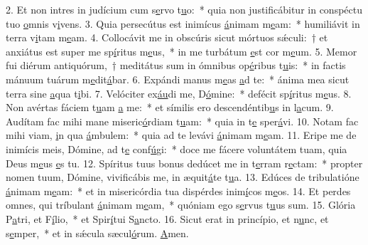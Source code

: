 2. Et non intres in judícium cum s\uline{e}rvo t\uline{u}o:~* quia non justificábitur in conspéctu tuo \uline{o}mnis v\uline{i}vens.
3. Quia persecútus est inimícus \uline{á}nimam m\uline{e}am:~* humiliávit in terra v\uline{i}tam m\uline{e}am.
4. Collocávit me in obscúris sicut mórtuos sǽculi:~† et anxiátus est super me sp\uline{í}ritus m\uline{e}us,~* in me turbátum \uline{e}st cor m\uline{e}um.
5. Memor fui diérum antiquórum,~† meditátus sum in ómnibus op\uline{é}ribus t\uline{u}is:~* in factis mánuum tuárum m\uline{e}dit\uline{á}bar.
6. Expándi manus m\uline{e}as \uline{a}d te:~* ánima mea sicut terra sine \uline{a}qua t\uline{i}bi.
7. Velóciter ex\uline{áu}di me, D\uline{ó}mine:~* defécit sp\uline{í}ritus m\uline{e}us.
8. Non avértas fáciem t\uline{u}am \uline{a} me:~* et símilis ero descendéntib\uline{u}s in l\uline{a}cum.
9. Audítam fac mihi mane miseric\uline{ó}rdiam t\uline{u}am:~* quia in t\uline{e} sper\uline{á}vi.
10. Notam fac mihi viam, \uline{i}n qua \uline{á}mbulem:~* quia ad te levávi \uline{á}nimam m\uline{e}am.
11. Eripe me de inimícis meis, Dómine, ad t\uline{e} conf\uline{ú}gi:~* doce me fácere voluntátem tuam, quia Deus m\uline{e}us \uline{e}s tu.
12. Spíritus tuus bonus dedúcet me in t\uline{e}rram r\uline{e}ctam:~* propter nomen tuum, Dómine, vivificábis me, in æquit\uline{á}te t\uline{u}a.
13. Edúces de tribulatióne \uline{á}nimam m\uline{e}am:~* et in misericórdia tua dispérdes inim\uline{í}cos m\uline{e}os.
14. Et perdes omnes, qui tríbulant \uline{á}nimam m\uline{e}am,~* quóniam ego s\uline{e}rvus t\uline{u}us sum.
15. Glória P\uline{a}tri, et F\uline{í}lio,~* et Spir\uline{í}tui S\uline{a}ncto.
16. Sicut erat in princípio, et n\uline{u}nc, et s\uline{e}mper,~* et in sǽcula sæcul\uline{ó}rum. \uline{A}men.
